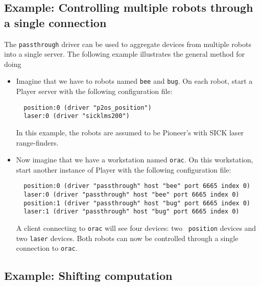 


\subsection*{Example: Controlling multiple robots through a single connection}

The {\tt passthrough} driver can be used to aggregate devices from multiple
robots into a single server.  The following example illustrates the general
method for doing 
%
\begin{itemize}
\item Imagine that we have to robots named {\tt bee} and {\tt bug}.
On each robot, start a Player server with the following configuration
file:
  \begin{verbatim}
  position:0 (driver "p2os_position")
  laser:0 (driver "sicklms200")
  \end{verbatim}
In this example, the robots are assumed to be Pioneer's with SICK
laser range-finders. 
\item Now imagine that we have a workstation named {\tt orac}.  On
this workstation, start another instance of Player with the following
configuration file:
  \begin{verbatim}
  position:0 (driver "passthrough" host "bee" port 6665 index 0)
  laser:0 (driver "passthrough" host "bee" port 6665 index 0) 
  position:1 (driver "passthrough" host "bug" port 6665 index 0)
  laser:1 (driver "passthrough" host "bug" port 6665 index 0) 
  \end{verbatim}
A client connecting to {\tt orac} will see four devices: two {\tt
position} devices and two {\tt laser} devices.  Both robots can now be
controlled through a single connection to {\tt orac}.
\end{itemize}


\subsection*{Example: Shifting computation}

